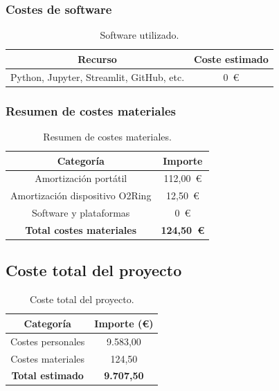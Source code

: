 \subsubsection{Costes de software}

\begin{table}[H]
\centering
\begin{tabular}{|c|c|}
\hline
\textbf{Recurso} & \textbf{Coste estimado} \\
\hline
Python, Jupyter, Streamlit, GitHub, etc. & 0~€ \\
\hline
\end{tabular}
\caption{Software utilizado.}
\end{table}

\subsubsection{Resumen de costes materiales}

\begin{table}[H]
\centering
\begin{tabular}{|c|c|}
\hline
\textbf{Categoría} & \textbf{Importe} \\
\hline
Amortización portátil & 112,00~€ \\
Amortización dispositivo O2Ring & 12,50~€ \\
Software y plataformas & 0~€ \\
\textbf{Total costes materiales} & \textbf{124,50~€} \\
\hline
\end{tabular}
\caption{Resumen de costes materiales.}
\end{table}

\subsection{Coste total del proyecto}

\begin{table}[H]
\centering
\begin{tabular}{|c|c|}
\hline
\textbf{Categoría} & \textbf{Importe (€)} \\
\hline
Costes personales & 9.583,00 \\
Costes materiales & 124,50 \\
\textbf{Total estimado} & \textbf{9.707,50} \\
\hline
\end{tabular}
\caption{Coste total del proyecto.}
\end{table}


